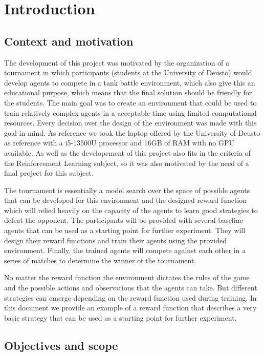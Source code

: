 \documentclass[conf]{new-aiaa}
\begin{document}
\section{Introduction}

\subsection{Context and motivation}

The development of this project was motivated by the organization of a tournament in which participants (students at the University of Deusto) would develop agents to compete in a tank battle environment, which also give this an educational purpose, which means that the final solution should be friendly for the students. The main goal was to create an environment that could be used to train relatively complex agents in a acceptable time using limited computational resources. Every decision over the design of the environment was made with this goal in mind. As reference we took the laptop offered by the University of Deusto as reference with a i5-13500U processor and 16GB of RAM  with no GPU available. As well as the developement of this project also fits in the criteria of the Reinforcement Learning subject, so it was also motivated by the need of a final project for this subject.

The tournament is essentially a model search over the space of possible agents that can be developed for this environment and the designed reward function which will relied heavily on the capacity of the agents to learn good strategies to defeat the opponent. The participants will be provided with several baseline agents that can be used as a starting point for further experiment. They will design their reward functions and train their agents using the provided environment. Finally, the trained agents will compete against each other in a series of matches to determine the winner of the tournament.

No matter the reward function the environment dictates the rules of the game and the possible actions and observations that the agents can take. But different strategies can emerge depending on the reward function used during training. In this document we provide an example of a reward function that describes a very basic strategy that can be used as a starting point for further experiment.

\subsection{Objectives and scope}
\end{document}
